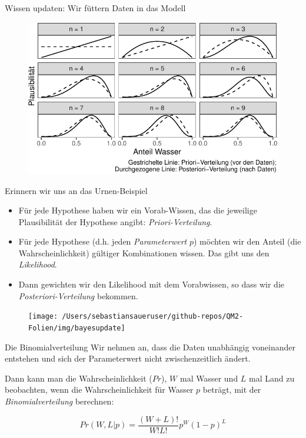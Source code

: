 \documentclass[
  ngerman,
  ignorenonframetext,
]{beamer}
\begin{document}
\begin{frame}{Wissen updaten: Wir füttern Daten in das Modell}
\protect\hypertarget{wissen-updaten-wir-fuxfcttern-daten-in-das-modell}{}
\begin{figure}[H]
\includegraphics[width=1\linewidth]{unnamed-chunk-19-1} \end{figure}
\end{frame}

\begin{frame}{Erinnern wir uns an das Urnen-Beispiel}
\protect\hypertarget{erinnern-wir-uns-an-das-urnen-beispiel}{}
\begin{itemize}
\item
  Für jede Hypothese haben wir ein Vorab-Wissen, das die jeweilige
  Plausibilität der Hypothese angibt: \emph{Priori-Verteilung}.
\item
  Für jede Hypothese (d.h. jeden \emph{Parameterwert} \(p\)) möchten wir
  den Anteil (die Wahrscheinlichkeit) gültiger Kombinationen wissen. Das
  gibt uns den \emph{Likelihood}.
\item
  Dann gewichten wir den Likelihood mit dem Vorabwissen, so dass wir die
  \emph{Posteriori-Verteilung} bekommen.
\end{itemize}

\begin{figure}[H]
\texttt{[image: /Users/sebastiansaueruser/github-repos/QM2-Folien/img/bayesupdate]} \end{figure}
\end{frame}

\begin{frame}{Die Binomialverteilung}
\protect\hypertarget{die-binomialverteilung}{}
Wir nehmen an, dass die Daten unabhängig voneinander entstehen und sich
der Parameterwert nicht zwischenzeitlich ändert.

Dann kann man die Wahrscheinlichkeit (\(Pr\)), \(W\) mal Wasser und
\(L\) mal Land zu beobachten, wenn die Wahrscheinlichkeit für Wasser
\(p\) beträgt, mit der \emph{Binomialverteilung} berechnen:

\[Pr(W,L|p) = \frac{(W+L)!}{W!L!}p^W(1-p)^L\]
\end{frame}
\end{document}
